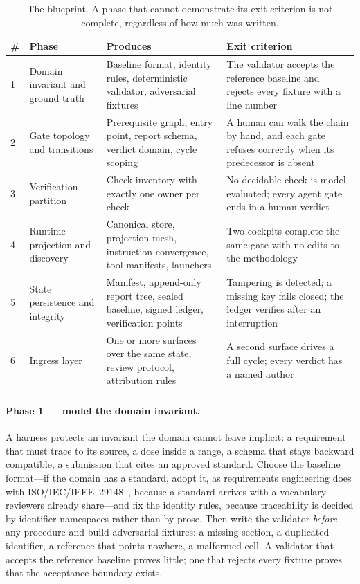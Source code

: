\documentclass[10pt,a4paper]{article}
\theoremstyle{definition}
\theoremstyle{plain}
\theoremstyle{principle}
\begin{document}
\begin{table}[htbp]
\centering
\caption{The blueprint. A phase that cannot demonstrate its exit criterion is not complete,
regardless of how much was written.}
\label{tab:blueprint}
\small
\begin{tabularx}{\textwidth}{@{}p{0.5cm} >{\raggedright\arraybackslash}p{2.75cm} >{\raggedright\arraybackslash}X >{\raggedright\arraybackslash}X@{}}
\toprule
\textbf{\#} & \textbf{Phase} & \textbf{Produces} & \textbf{Exit criterion} \\
\midrule
1 & Domain invariant and ground truth & Baseline format, identity rules, deterministic validator, adversarial fixtures & The validator accepts the reference baseline and rejects every fixture with a line number \\
2 & Gate topology and transitions & Prerequisite graph, entry point, report schema, verdict domain, cycle scoping & A human can walk the chain by hand, and each gate refuses correctly when its predecessor is absent \\
3 & Verification partition & Check inventory with exactly one owner per check & No decidable check is model-evaluated; every agent gate ends in a human verdict \\
4 & Runtime projection and discovery & Canonical store, projection mesh, instruction convergence, tool manifests, launchers & Two cockpits complete the same gate with no edits to the methodology \\
5 & State persistence and integrity & Manifest, append-only report tree, sealed baseline, signed ledger, verification points & Tampering is detected; a missing key fails closed; the ledger verifies after an interruption \\
6 & Ingress layer & One or more surfaces over the same state, review protocol, attribution rules & A second surface drives a full cycle; every verdict has a named author \\
\bottomrule
\end{tabularx}
\end{table}

\paragraph{Phase 1 --- model the domain invariant.} A harness protects an invariant the domain
cannot leave implicit: a requirement that must trace to its source, a dose inside a range, a schema
that stays backward compatible, a submission that cites an approved standard. Choose the baseline
format---if the domain has a standard, adopt it, as requirements engineering does with
ISO/IEC/IEEE~29148~\cite{ieee29148}, because a standard arrives with a vocabulary reviewers already
share---and fix the identity rules, because traceability is decided by identifier
namespaces rather than by prose. Then write the validator \emph{before} any procedure and build
adversarial fixtures: a missing section, a duplicated identifier, a reference that points nowhere,
a malformed cell. A validator that accepts the reference baseline proves little; one that rejects
every fixture proves that the acceptance boundary exists.
\end{document}
